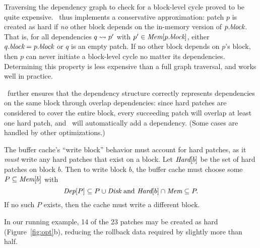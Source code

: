 Traversing the dependency graph to check for a block-level cycle
proved to be quite expensive.
%
\Kudos\ thus implements a conservative approximation: patch $p$ is
created as hard if \emph{no} other block depends on the in-memory
version of $p.\textit{block}$.
%
That is, for all dependencies $q \leadsto p'$ with $p' \in
\PMem[\PBlock{p}]$, either $q.\textit{block} = p.\textit{block}$ or $q$ is an empty
patch.
%
If no other block depends on $p$'s block, then $p$ can never initiate a
block-level cycle no matter its dependencies.
%
Determining this property is less expensive than a full graph
traversal, and works well in practice.


\Kudos\ further ensures that the dependency structure correctly
represents dependencies on the same block through overlap
dependencies: since hard patches are considered to cover the entire
block, every succeeding patch will overlap at least one hard patch,
and \Kudos\ will automatically add a dependency.
%
(Some cases are handled by other optimizations.)


The buffer cache's ``write block'' behavior must account for hard
patches, as it \emph{must} write any hard patches that exist on a
block.
%
Let $\PHard[b]$ be the set of hard patches on block $b$.
%
Then to write block $b$, the buffer cache must choose some $P \subseteq
\PMem[b]$ with
%
\[ \PDepset{P} \subseteq P \cup \PDisk \text{ and } \PHard[b] \cap \PMem
\subseteq P. \]
%
If no such $P$ exists, then the cache must write a different block.


In our running example, 14 of the 23 patches may be created as hard
(Figure~\ref{fig:opt}b),
%
reducing the rollback data required by slightly more than half.


